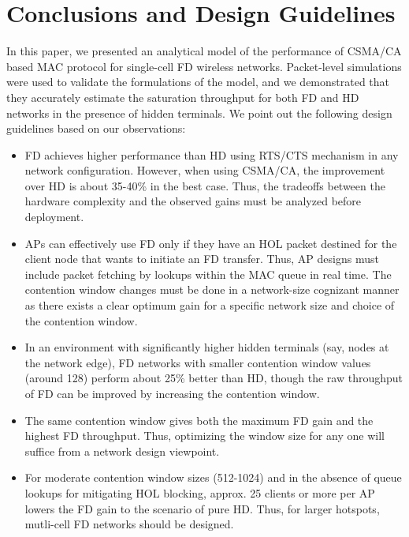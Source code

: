 \documentclass[10pt,journal,cspaper,compsoc]{IEEEtran}
\begin{document}
\section{Conclusions and Design Guidelines}
\label{sec:conc}
In this paper, we presented an analytical model of the performance of CSMA/CA based MAC protocol for single-cell FD wireless networks. Packet-level simulations were used to validate the formulations of the model, and we demonstrated that they accurately estimate the saturation throughput for both FD and HD networks in the presence of hidden terminals. We point out the following design guidelines based on our observations:
\begin{itemize}
\item FD achieves higher performance than HD using RTS/CTS mechanism in any network configuration. However, when using CSMA/CA, the improvement over HD is about 35-40\% in the best case. Thus, the tradeoffs between the hardware complexity and the observed gains must be analyzed before deployment.

\item APs can effectively use FD only if they have an HOL packet destined for the client node that wants to initiate an FD transfer. Thus, AP designs must include packet fetching by lookups within the MAC queue in real time. The contention window changes must be done in a network-size cognizant manner as there exists a clear optimum gain for a specific network size and choice of the contention window.   

\item In an environment with significantly higher hidden terminals (say, nodes at the network edge), FD networks with smaller contention window values (around 128) perform about 25\% better than HD, though the raw throughput of FD can be improved by increasing the contention window. 

\item The same contention window gives both the maximum FD gain and the highest FD throughput. Thus, optimizing the window size for any one will suffice from a network design viewpoint. 

\item For moderate contention window sizes (512-1024) and in the absence of queue lookups for mitigating HOL blocking, approx. 25 clients or more per AP lowers the FD gain to the scenario of pure HD. Thus, for larger hotspots, mutli-cell FD networks should be designed.  
\end{itemize}
\end{document}
